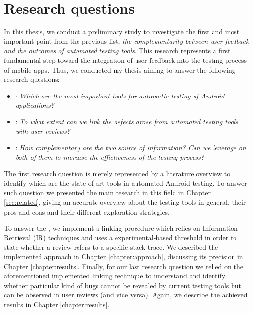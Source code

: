 \section{Research questions}
\label{section:rqs}
In this thesis, we conduct a preliminary study to investigate the first and most important point from the previous list, \ie \textit{the complementarity between user feedback and the outcomes of automated testing tools}. This research represents a first fundamental step toward the integration of user feedback into the testing process of mobile apps. Thus, we conducted my thesis aiming to answer the following research questions:

\begin{itemize}
	\item {}: \textit{Which are the most important tools for automatic testing of Android applications?} %
	\item {}: \textit{To what extent can we link the defects arose from automated testing tools with user reviews?}  
	\item {}: \textit{How complementary are the two source of information? Can we leverage on both of them to increase the effictiveness of the testing process?}
\end{itemize}
The first research question is merely represented by a literature overview to identify which are the state-of-art tools in automated Android testing. To answer such question we presented the main research in this field in Chapter \ref{sec:related}, giving an accurate overview about the testing tools in general, their pros and cons and their different exploration strategies. 

To answer the , we implement a linking procedure which relies on Information Retrieval (IR) techniques and uses a experimental-based threshold in order to state whether a review refers to a specific stack trace. We described the implemented approach in Chapter \ref{chapter:approach}, discussing its precision in Chapter \ref{chapter:results}.
Finally, for our last research question we relied on the aforementioned implemented linking technique to understand and identify whether particular kind of bugs cannot be revealed by current testing tools but can be observed in user reviews (and vice versa). Again, we describe the achieved results in Chapter \ref{chapter:results}.